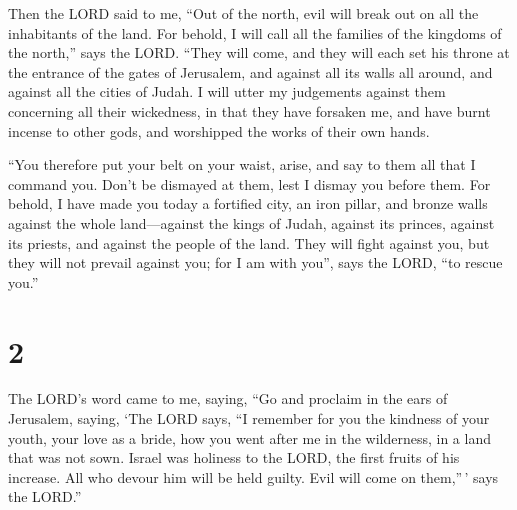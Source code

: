  Then the LORD said to me, ``Out of the north, evil will
break out on all the inhabitants of the land.  For behold,
I will call all the families of the kingdoms of the north,'' says the
LORD. ``They will come, and they will each set his throne at the
entrance of the gates of Jerusalem, and against all its walls all
around, and against all the cities of Judah.  I will utter
my judgements against them concerning all their wickedness, in that they
have forsaken me, and have burnt incense to other gods, and worshipped
the works of their own hands.

 ``You therefore put your belt on your waist, arise, and
say to them all that I command you. Don't be dismayed at them, lest I
dismay you before them.  For behold, I have made you today
a fortified city, an iron pillar, and bronze walls against the whole
land---against the kings of Judah, against its princes, against its
priests, and against the people of the land.  They will
fight against you, but they will not prevail against you; for I am with
you'', says the LORD, ``to rescue you.''

\hypertarget{section-1}{%
\section{2}\label{section-1}}

 The LORD's word came to me, saying,  ``Go and
proclaim in the ears of Jerusalem, saying, `The LORD says, ``I remember
for you the kindness of your youth, your love as a bride, how you went
after me in the wilderness, in a land that was not sown. 
Israel was holiness to the LORD, the first fruits of his increase. All
who devour him will be held guilty. Evil will come on them,''\,' says
the LORD.''

